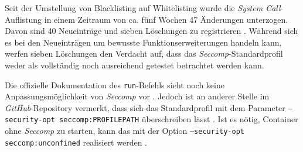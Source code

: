 \documentclass[../main.tex]{subfiles}
\begin{document}
			Seit der Umstellung von Blacklisting auf Whitelisting wurde die \emph{System Call}-Auflistung in einem Zeitraum von ca. fünf Wochen 47 Änderungen unterzogen. Davon sind 40 Neueinträge und sieben Löschungen zu registrieren \cite{githubSeccompProfileHistory}. Während sich es bei den Neueinträgen um bewusste Funktionserweiterungen handeln kann, werfen sieben Löschungen den Verdacht auf, dass das \emph{Seccomp}-Standardprofil weder als vollständig noch ausreichend getestet betrachtet werden kann.

			Die offizielle Dokumentation des \texttt{run}-Befehls sieht noch keine Anpassungsmöglichkeit von \emph{Seccomp} vor \cite{dockerRun}. Jedoch ist an anderer Stelle im \emph{GitHub}-Repository vermerkt, dass sich das Standardprofil mit dem Parameter \texttt{--security-opt seccomp:PROFILEPATH} überschreiben lässt \cite{githubSeccompDoc}. Ist es nötig, Container ohne \emph{Seccomp} zu starten, kann das mit der Option \texttt{--security-opt seccomp:unconfined} realisiert werden \cite{docker110Security}.




\end{document}
